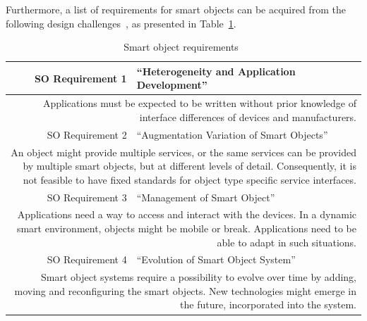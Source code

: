 Furthermore, a list of requirements for smart objects can be acquired from the following design challenges~\cite{A_Document_Centric_Framework_for_Building_Distributed_Smart_Object_Systems}, as presented in Table~\ref{table:SO_requirements}.

\bgroup
\def\arraystretch{1.3} %
\setlength\doublerulesep{2ex}
\begin{table}[H]
  \centering
  \caption{Smart object requirements~\cite{A_Document_Centric_Framework_for_Building_Distributed_Smart_Object_Systems}}
  \smallskip
  \label{table:SO_requirements}
  \selectfont %
  \begin{tabular}{|r|l|} \hline
    SO Requirement 1 & ``Heterogeneity and Application Development'' \\ \hline
  \multicolumn{2}{|p{\textwidth}|}{Applications must be expected to be written without prior knowledge of interface differences of devices and manufacturers.} \\ \hline \hline

  SO Requirement 2 &``Augmentation Variation of Smart Objects'' \\ \hline
  \multicolumn{2}{|p{\textwidth}|}{An object might provide multiple services, or the same services can be provided by multiple smart objects, but at different levels of detail. Consequently, it is not feasible to have fixed standards for object type specific service interfaces.} \\ \hline \hline
  
  SO Requirement 3 &``Management of Smart Object'' \\ \hline
  \multicolumn{2}{|p{\textwidth}|}{Applications need a way to access and interact with the devices. In a dynamic smart environment, objects might be mobile or break. Applications need to be able to adapt in such situations.} \\ \hline \hline

  SO Requirement 4 &``Evolution of Smart Object System'' \\ \hline
  \multicolumn{2}{|p{\textwidth}|}{Smart object systems require a possibility to evolve over time by adding, moving and reconfiguring the smart objects. New technologies might emerge in the future, incorporated into the system.} \\ \hline

  \end{tabular}
\end{table}
\egroup

